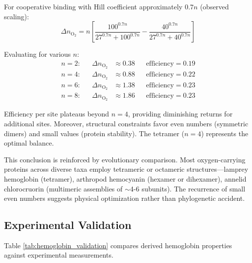 \documentclass[12pt,a4paper]{article}
\theoremstyle{remark}
\begin{document}
For cooperative binding with Hill coefficient approximately $0.7n$ (observed scaling):
\begin{equation}
\Delta n_{\mathrm{O}_{2}} = n\left[\frac{100^{0.7n}}{27^{0.7n} + 100^{0.7n}} - \frac{40^{0.7n}}{27^{0.7n} + 40^{0.7n}}\right]
\end{equation}

Evaluating for various $n$:
\begin{align}
n = 2: &&\Delta n_{\mathrm{O}_{2}} &\approx 0.38 &&\text{efficiency} = 0.19 \\
n = 4: &&\Delta n_{\mathrm{O}_{2}} &\approx 0.88 &&\text{efficiency} = 0.22 \\
n = 6: &&\Delta n_{\mathrm{O}_{2}} &\approx 1.38 &&\text{efficiency} = 0.23 \\
n = 8: &&\Delta n_{\mathrm{O}_{2}} &\approx 1.86 &&\text{efficiency} = 0.23
\end{align}

Efficiency per site plateaus beyond $n = 4$, providing diminishing returns for additional sites. Moreover, structural constraints favor even numbers (symmetric dimers) and small values (protein stability). The tetramer ($n = 4$) represents the optimal balance.

This conclusion is reinforced by evolutionary comparison. Most oxygen-carrying proteins across diverse taxa employ tetrameric or octameric structures—lamprey hemoglobin (tetramer), arthropod hemocyanin (hexamer or dihexamer), annelid chlorocruorin (multimeric assemblies of $\sim$4-6 subunits). The recurrence of small even numbers suggests physical optimization rather than phylogenetic accident.

\subsection{Experimental Validation}

Table \ref{tab:hemoglobin_validation} compares derived hemoglobin properties against experimental measurements.
\end{document}
